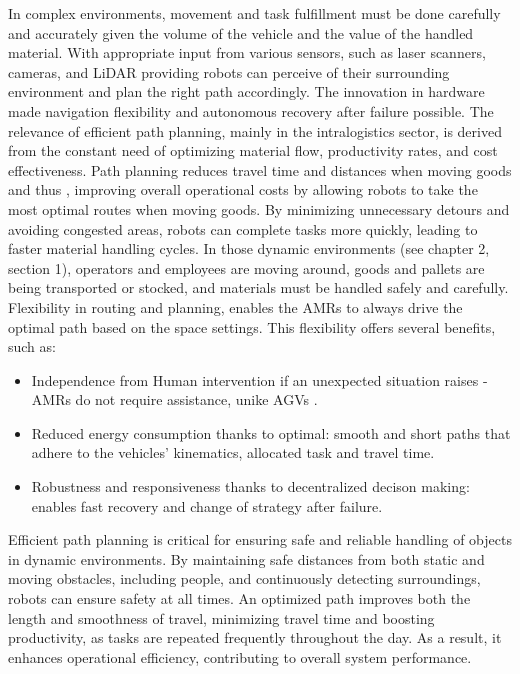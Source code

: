 In complex environments, movement and task fulfillment must be done carefully and accurately given 
the volume of the vehicle and the value of the handled material. With appropriate input from various sensors, 
such as laser 
scanners, cameras, and LiDAR providing robots can perceive of their surrounding environment and plan the right path
accordingly. The innovation in hardware made navigation flexibility and autonomous recovery 
after failure possible\cite{R7}.
The relevance of efficient path planning, mainly in the intralogistics sector, is derived from the constant need 
of optimizing material flow, productivity rates, and cost effectiveness. Path planning reduces
travel time and distances when moving goods and thus , improving overall operational costs by allowing robots 
to take the most optimal routes when moving goods. By minimizing unnecessary detours and avoiding congested areas, 
robots can complete tasks more quickly, leading to faster material handling cycles.
In those dynamic environments (see chapter 2, section 1), operators and employees are moving around, 
goods and pallets are 
being transported or stocked, and materials must be handled safely and carefully.
Flexibility in routing and planning, enables the AMRs to always drive the optimal path
based on the space settings. This flexibility offers several benefits, such as:

\begin{itemize}
    \item Independence from Human intervention if an unexpected situation raises 
    -AMRs do not require assistance, unike AGVs \cite{R7}.
    \item Reduced energy consumption thanks to optimal: smooth and short paths that adhere to 
    the vehicles' kinematics, allocated task and travel time.
    \item Robustness and responsiveness thanks to decentralized decison making: enables fast 
    recovery and change of strategy after failure\cite{R7}.
\end{itemize}

Efficient path planning is critical for ensuring safe and reliable handling of objects in dynamic environments. 
By maintaining safe distances from both static and moving obstacles, including people, and continuously detecting 
surroundings, robots can ensure safety at all times. An optimized path improves both the length and 
smoothness of travel, minimizing travel time and boosting productivity, as tasks are repeated frequently 
throughout the day. As a result, it enhances operational efficiency, contributing to overall system 
performance.

